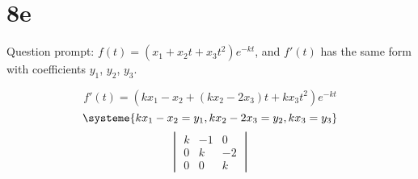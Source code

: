 \documentclass[12pt]{article}
\begin{document}
\section{8e}

Question prompt: $f(t) = (x_1 + x_2t + x_3t^2)e^{-kt}$, and $f'(t)$ has the same
form with coefficients $y_1$, $y_2$, $y_3$.

\[
  f'(t) = (kx_1 - x_2 + (kx_2-2x_3)t + kx_3t^2)e^{-kt}
\]
\[
  \systeme{kx_{1} - x_2 = y_1, kx_{2}-2x_3 = y_2, kx_{3} = y_3}
\]
\[
  \begin{vmatrix}
    k & -1 & 0 \\
    0 & k & -2 \\
    0 & 0 & k
  \end{vmatrix}
\]
\end{document}

